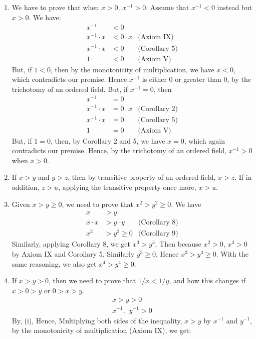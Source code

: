 \documentclass[12pt]{book}
\theoremstyle{definition}
\begin{document}
\begin{sol}
\begin{enumerate}[label=(\roman*)]
	\item We have to prove that when $x>0$, $x^{-1}>0$. Assume that $x^{-1}<0$ instead but $x>0$. We have:
		\begin{align*}
			x^{-1} &<0 \\
			x^{-1}\cdot x &< 0\cdot x & \text{(Axiom IX)}\\
			x^{-1}\cdot x &< 0  	 & \text{(Corollary 5)}\\
			1&<0 & \text{(Axiom V)}
		\end{align*}
		But, if $1<0$, then by the monotonicity of multiplication, we have $x<0$, which contradicts our premise. Hence $x^{-1}$ is either $0$ or greater than $0$, by the trichotomy of an ordered field. But, if $x^{-1}=0$, then
		\begin{align*}
			x^{-1}&=0 \\
			x^{-1}\cdot x &= 0 \cdot x & \text{(Corollary 2)}\\
			x^{-1}\cdot x &=0 &\text{(Corollary 5)}\\
			1&=0 & \text{(Axiom V)}
		\end{align*}
		But, if $1=0$, then, by Corollary 2 and 5, we have $x=0$, which again contradicts our premise. Hence, by the trichotomy of an ordered field, $x^{-1}>0$ when $x>0$.
	\item If $x>y$ and $y>z$, then by transitive property of an ordered field, $x>z$. If in addition, $z>u$, applying the transitive property once more, $x>u$.
	\item Given $x>y\geq 0$, we need to prove that $x^2>y^2\geq 0$. We have
		\begin{align*}
			x &>y \\
			x\cdot x &>y \cdot y & \text{(Corollary 8)}\\
			x^2&>y^2 \geq 0 & \text{(Corollary 9)}
		\end{align*}
		Similarly, applying Corollary 8, we get $x^3>y^3$, Then because $x^2>0$, $x^3>0$ by Axiom IX and Corollary 5. Similarly $y^3\geq 0$, Hence $x^3>y^3\geq 0$. With the same reasoning, we also get $x^4>y^4\geq 0$.
	\item If $x>y>0$, then we need to prove that $1/x<1/y$, and how this changes if $x>0>y$ or $0>x>y$.
		\begin{align*}
			x>y>0 \\
			x^{-1},\:\: y^{-1} >0
		\end{align*}
		By, (i), Hence, Multiplying both sides of the inequality, $x>y$ by $x^{-1}$ and $y^{-1}$, by the monotonicity of multiplication (Axiom IX), we get:

\end{enumerate}
\end{sol}
\end{document}
